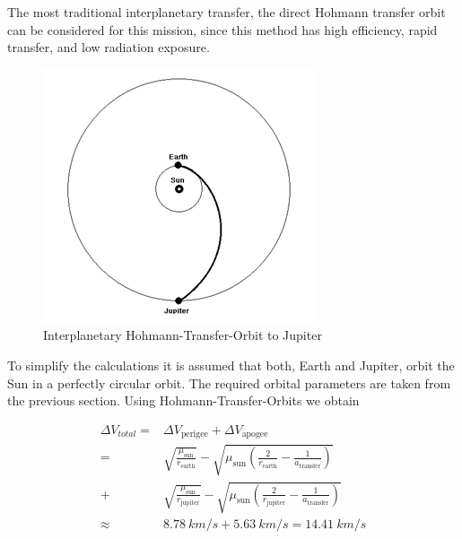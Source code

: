 

The most traditional interplanetary transfer, the direct Hohmann
transfer orbit can be considered for this mission, since this method
has high efficiency, rapid transfer, and low radiation
exposure.\cite{Wertz2011SpaceMissionEng}

\begin{figure}[h]
  \includegraphics[width=\textwidth]{Hohmann-Orbit}
  \caption{Interplanetary Hohmann-Transfer-Orbit to Jupiter}
\end{figure}

To simplify the calculations it is assumed that both, Earth and
Jupiter, orbit the Sun in a perfectly circular orbit.  The required
orbital parameters are taken from the previous section.  Using
Hohmann-Transfer-Orbits we obtain

\begin{align*}
  \Delta V_{total} = {} &
  \Delta V_{\mathrm{perigee}}
  + \Delta V_{\mathrm{apogee}} \\
  = {} & \sqrt{\frac{\mu_{\mathrm{sun}}}{r_{\mathrm{earth}}}}
  - \sqrt{\mu_{\mathrm{sun}} \left(\frac{2}{r_{\mathrm{earth}}}
    - \frac{1}{a_{\mathrm{transfer}}}\right)} \\
  + & \sqrt{\frac{\mu_{\mathrm{sun}}}{r_{\mathrm{jupiter}}}}
  - \sqrt{\mu_{\mathrm{sun}}\left(\frac{2}{r_{\mathrm{jupiter}}}
    - \frac{1}{a_{\mathrm{transfer}}}\right)} \\
  \approx {} & \SI{8.78}{km/s} + \SI{5.63}{km/s} = \SI{14.41}{km/s} \\
\end{align*}

